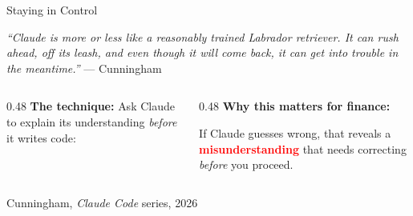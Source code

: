\documentclass[aspectratio=169, 11pt]{beamer}
\newcommand{\emphcoral}[1]{\textcolor{red}{\textbf{#1}}}
\newcommand{\sourceref}[1]{\vspace{0.15cm}\hfill{\tiny\textcolor{medgray}{#1}}}
\begin{document}
\begin{frame}{Staying in Control}
\begin{quotebox}
  \textit{``Claude is more or less like a reasonably trained Labrador retriever. It can rush ahead, off its leash, and even though it will come back, it can get into trouble in the meantime.''}
  \hfill {\small --- Cunningham}
\end{quotebox}
\vspace{0.05cm}
\begin{columns}[T]
\begin{column}{0.48\textwidth}
  {\small\bfseries\color{navy} The technique:} {\small Ask Claude to explain its understanding \emph{before} it writes code:}
  \vspace{0.05cm}
\end{column}
\begin{column}{0.48\textwidth}
  {\small\bfseries\color{navy} Why this matters for finance:}
  \vspace{0.05cm}

  {\small If Claude guesses wrong, that reveals a \emphcoral{misunderstanding} that needs correcting \emph{before} you proceed.}
  \vspace{0.08cm}
\end{column}
\end{columns}
\sourceref{Cunningham, \textit{Claude Code} series, 2026}
\end{frame}
\end{document}
